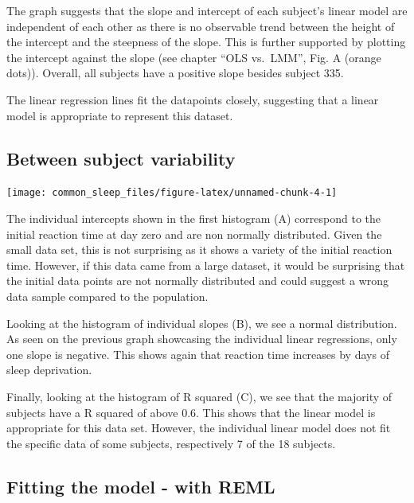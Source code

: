 \documentclass[
]{article}
\begin{document}
The graph suggests that the slope and intercept of each subject's linear
model are independent of each other as there is no observable trend
between the height of the intercept and the steepness of the slope. This
is further supported by plotting the intercept against the slope (see
chapter ``OLS vs.~LMM'', Fig. A (orange dots)). Overall, all subjects
have a positive slope besides subject 335.

The linear regression lines fit the datapoints closely, suggesting that
a linear model is appropriate to represent this dataset.

\hypertarget{between-subject-variability}{%
\subsection{Between subject
variability}\label{between-subject-variability}}

\begin{center}\texttt{[image: common\_sleep\_files/figure-latex/unnamed-chunk-4-1]} \end{center}

The individual intercepts shown in the first histogram (A) correspond to
the initial reaction time at day zero and are non normally distributed.
Given the small data set, this is not surprising as it shows a variety
of the initial reaction time. However, if this data came from a large
dataset, it would be surprising that the initial data points are not
normally distributed and could suggest a wrong data sample compared to
the population.

Looking at the histogram of individual slopes (B), we see a normal
distribution. As seen on the previous graph showcasing the individual
linear regressions, only one slope is negative. This shows again that
reaction time increases by days of sleep deprivation.

Finally, looking at the histogram of R squared (C), we see that the
majority of subjects have a R squared of above 0.6. This shows that the
linear model is appropriate for this data set. However, the individual
linear model does not fit the specific data of some subjects,
respectively 7 of the 18 subjects.

\hypertarget{fitting-the-model---with-reml}{%
\subsection{Fitting the model - with
REML}\label{fitting-the-model---with-reml}}
\end{document}
